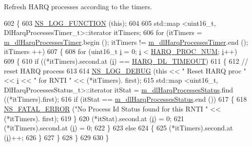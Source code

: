 Refresh H\+A\+RQ processes according to the timers. 


\begin{DoxyCode}
602 \{
603   \hyperlink{log-macros-disabled_8h_a90b90d5bad1f39cb1b64923ea94c0761}{NS\_LOG\_FUNCTION} (\textcolor{keyword}{this});
604 
605   std::map <uint16\_t, DlHarqProcessesTimer\_t>::iterator itTimers;
606   \textcolor{keywordflow}{for} (itTimers = \hyperlink{classns3_1_1TdMtFfMacScheduler_aa83d8f55bde8ea32e73820ad50ba2821}{m\_dlHarqProcessesTimer}.begin (); itTimers != 
      \hyperlink{classns3_1_1TdMtFfMacScheduler_aa83d8f55bde8ea32e73820ad50ba2821}{m\_dlHarqProcessesTimer}.end (); itTimers ++)
607     \{
608       \textcolor{keywordflow}{for} (uint16\_t \hyperlink{bernuolliDistribution_8m_a6f6ccfcf58b31cb6412107d9d5281426}{i} = 0; \hyperlink{bernuolliDistribution_8m_a6f6ccfcf58b31cb6412107d9d5281426}{i} < \hyperlink{cqa-ff-mac-scheduler_8h_a9185d8d7d2b2979181d4a7044a3d3555}{HARQ\_PROC\_NUM}; \hyperlink{bernuolliDistribution_8m_a6f6ccfcf58b31cb6412107d9d5281426}{i}++)
609         \{
610           \textcolor{keywordflow}{if} ((*itTimers).second.at (\hyperlink{bernuolliDistribution_8m_a6f6ccfcf58b31cb6412107d9d5281426}{i}) == \hyperlink{cqa-ff-mac-scheduler_8h_add9e0c4889dc1b5b25686480b31ad166}{HARQ\_DL\_TIMEOUT})
611             \{
612               \textcolor{comment}{// reset HARQ process}
613               
614               \hyperlink{group__logging_ga413f1886406d49f59a6a0a89b77b4d0a}{NS\_LOG\_DEBUG} (\textcolor{keyword}{this} << \textcolor{stringliteral}{" Reset HARQ proc "} << \hyperlink{bernuolliDistribution_8m_a6f6ccfcf58b31cb6412107d9d5281426}{i} << \textcolor{stringliteral}{" for RNTI "} << (*itTimers).
      first);
615               std::map <uint16\_t, DlHarqProcessesStatus\_t>::iterator itStat = 
      \hyperlink{classns3_1_1TdMtFfMacScheduler_a4f261a098821d6cb892196a257595cb2}{m\_dlHarqProcessesStatus}.find ((*itTimers).first);
616               \textcolor{keywordflow}{if} (itStat == \hyperlink{classns3_1_1TdMtFfMacScheduler_a4f261a098821d6cb892196a257595cb2}{m\_dlHarqProcessesStatus}.end ())
617                 \{
618                   \hyperlink{group__fatal_ga5131d5e3f75d7d4cbfd706ac456fdc85}{NS\_FATAL\_ERROR} (\textcolor{stringliteral}{"No Process Id Status found for this RNTI "} << (*itTimers).
      first);
619                 \}
620               (*itStat).second.at (\hyperlink{bernuolliDistribution_8m_a6f6ccfcf58b31cb6412107d9d5281426}{i}) = 0;
621               (*itTimers).second.at (\hyperlink{bernuolliDistribution_8m_a6f6ccfcf58b31cb6412107d9d5281426}{i}) = 0;
622             \}
623           \textcolor{keywordflow}{else}
624             \{
625               (*itTimers).second.at (\hyperlink{bernuolliDistribution_8m_a6f6ccfcf58b31cb6412107d9d5281426}{i})++;
626             \}
627         \}
628     \}
629   
630 \}
\end{DoxyCode}


